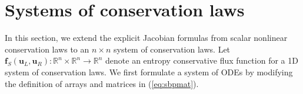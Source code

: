 \documentclass{article}
\begin{document}
%

\section{Systems of conservation laws}
\label{sec:systems}

In this section, we extend the explicit Jacobian formulas from scalar nonlinear conservation laws to an $n\times n$ system of conservation laws.  Let $\bm{f}_{S}(\bm{u}_L,\bm{u}_R): \mathbb{R}^{n}\times \mathbb{R}^n \rightarrow \mathbb{R}^n$ denote an entropy conservative flux function for a 1D system of conservation laws.  We first formulate a system of ODEs by modifying the definition of arrays and matrices in (\ref{eq:sbpmat}).
\end{document}
